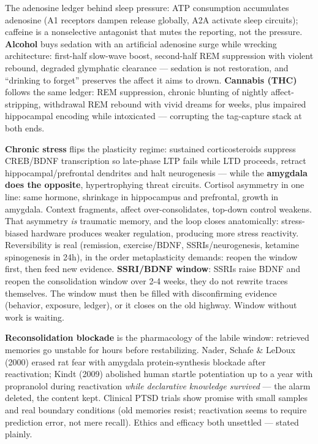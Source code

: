 \documentclass[11pt]{article}
\begin{document}
The adenosine ledger behind sleep pressure: ATP consumption accumulates adenosine (A1 receptors dampen release globally, A2A activate sleep circuits); caffeine is a nonselective antagonist that mutes the reporting, not the pressure. \textbf{Alcohol} buys sedation with an artificial adenosine surge while wrecking architecture: first-half slow-wave boost, second-half REM suppression with violent rebound, degraded glymphatic clearance --- sedation is not restoration, and ``drinking to forget'' preserves the affect it aims to drown. \textbf{Cannabis (THC)} follows the same ledger: REM suppression, chronic blunting of nightly affect-stripping, withdrawal REM rebound with vivid dreams for weeks, plus impaired hippocampal encoding while intoxicated --- corrupting the tag-capture stack at both ends.

\textbf{Chronic stress} flips the plasticity regime: sustained corticosteroids suppress CREB/BDNF transcription so late-phase LTP fails while LTD proceeds, retract hippocampal/prefrontal dendrites and halt neurogenesis --- while the \textbf{amygdala does the opposite}, hypertrophying threat circuits. Cortisol asymmetry in one line: same hormone, shrinkage in hippocampus and prefrontal, growth in amygdala. Context fragments, affect over-consolidates, top-down control weakens. That asymmetry \emph{is} traumatic memory, and the loop closes anatomically: stress-biased hardware produces weaker regulation, producing more stress reactivity. Reversibility is real (remission, exercise/BDNF, SSRIs/neurogenesis, ketamine spinogenesis in 24h), in the order metaplasticity demands: reopen the window first, then feed new evidence. \textbf{SSRI/BDNF window}: SSRIs raise BDNF and reopen the consolidation window over 2-4 weeks, they do not rewrite traces themselves. The window must then be filled with disconfirming evidence (behavior, exposure, ledger), or it closes on the old highway. Window without work is waiting.

\textbf{Reconsolidation blockade} is the pharmacology of the labile window: retrieved memories go unstable for hours before restabilizing. Nader, Schafe \& LeDoux (2000) erased rat fear with amygdala protein-synthesis blockade after reactivation; Kindt (2009) abolished human startle potentiation up to a year with propranolol during reactivation \emph{while declarative knowledge survived} --- the alarm deleted, the content kept. Clinical PTSD trials show promise with small samples and real boundary conditions (old memories resist; reactivation seems to require prediction error, not mere recall). Ethics and efficacy both unsettled --- stated plainly.
\end{document}
